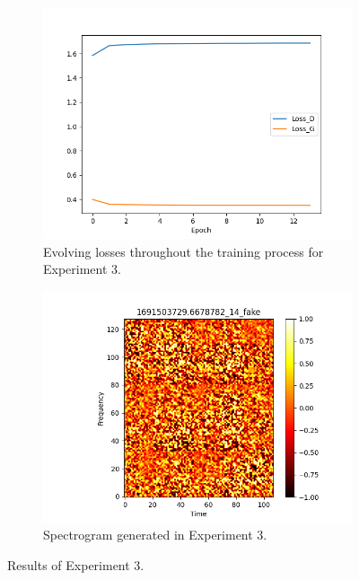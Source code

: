 \begin{figure}[!ht]
    \centering
    \begin{subfigure}{0.45\textwidth}
        \includegraphics[width=\textwidth]{figures/4.5-results/exp3_loss.png}
        \caption{Evolving losses throughout the training process for Experiment 3.}
        \label{fig:exp3_loss}
    \end{subfigure}
    \begin{subfigure}{0.45\textwidth}
        \includegraphics[width=\textwidth]{figures/4.5-results/exp3_spectrogram.png}
        \caption{Spectrogram generated in Experiment 3.}
        \label{fig:exp3_spectrogram}
    \end{subfigure}
    \caption{Results of Experiment 3.}
    \label{fig:exp3_results}
\end{figure}